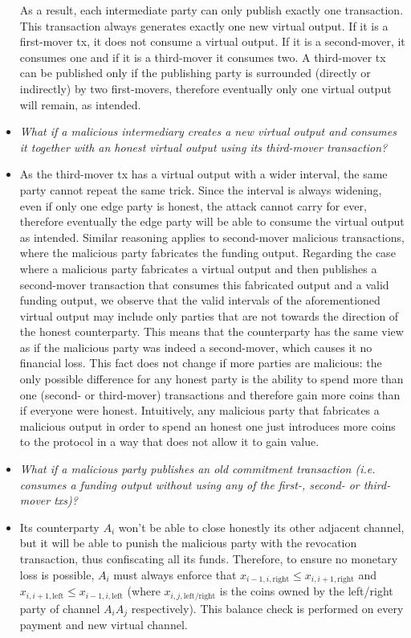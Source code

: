 \begin{itemize}
  As a result, each intermediate party can only publish exactly one transaction.
  This transaction always generates exactly one new virtual output. If it is a
  first-mover tx, it does not consume a virtual output. If it is a second-mover,
  it consumes one and if it is a third-mover it consumes two. A third-mover tx
  can be published only if the publishing party is surrounded (directly or
  indirectly) by two first-movers, therefore eventually only one virtual output
  will remain, as intended.
  \item \emph{What if a malicious intermediary creates a new virtual output and
  consumes it together with an honest virtual output using its third-mover
  transaction?}
  \item As the third-mover tx has a virtual output with a wider interval, the
  same party cannot repeat the same trick. Since the interval is always
  widening, even if only one edge party is honest, the attack cannot carry for
  ever, therefore eventually the edge party will be able to consume the virtual
  output as intended. Similar reasoning applies to second-mover malicious
  transactions, where the malicious party fabricates the funding output.
  Regarding the case where a malicious party fabricates a virtual output and
  then publishes a second-mover transaction that consumes this fabricated output
  and a valid funding output, we observe that the valid intervals of the
  aforementioned virtual output may include only parties that are not towards
  the direction of the honest counterparty. This means that the counterparty
  has the same view as if the malicious party was indeed a second-mover, which
  causes it no financial loss. This fact does not change if more parties
  are malicious: the only possible difference for any honest party is the
  ability to spend more than one (second- or third-mover) transactions and
  therefore gain more coins than if everyone were honest. Intuitively, any
  malicious party that fabricates a malicious output in order to spend an honest
  one just introduces more coins to the protocol in a way that does not allow it
  to gain value.
  \item \emph{What if a malicious party publishes an old commitment transaction
  (i.e. consumes a funding output without using any of the first-, second- or
  third-mover txs)?}
  \item Its counterparty $A_i$ won't be able to close honestly its other
  adjacent channel, but it will be able to punish the malicious party with the
  revocation transaction, thus confiscating all its funds. Therefore, to ensure
  no monetary loss is possible, $A_i$ must always enforce that $x_{i-1, i,
  \mathrm{right}} \leq x_{i, i+1, \mathrm{right}}$ and $x_{i, i+1,
  \mathrm{left}} \leq x_{i-1, i, \mathrm{left}}$ (where $x_{i, j,
  \mathrm{left/right}}$ is the coins owned by the left/right party of channel
  $A_i A_j$ respectively). This balance check is performed on every payment and
  new virtual channel.
\end{itemize}
